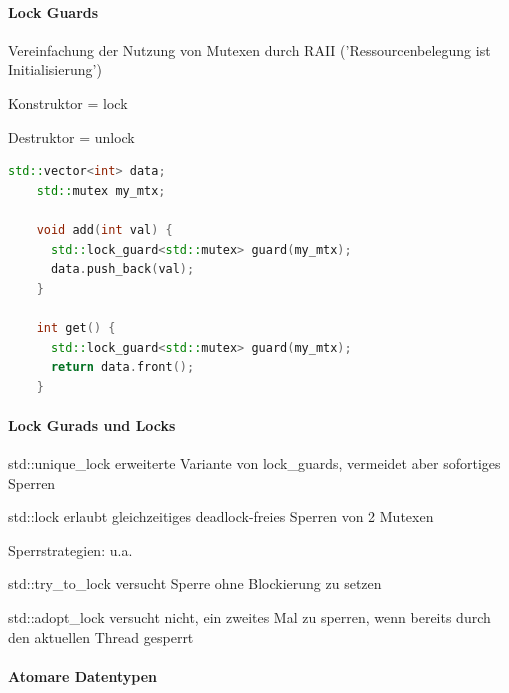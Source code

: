 \documentclass[10pt]{article}
\begin{document}
  \paragraph{Lock Guards}
  
  \begin{itemize*}
    \item Vereinfachung der Nutzung von Mutexen durch RAII ('Ressourcenbelegung ist Initialisierung')
    \item Konstruktor = lock
    \item Destruktor = unlock
  \end{itemize*}
  
  \begin{lstlisting}[language=C++]
    std::vector<int> data;
    std::mutex my_mtx;
  
    void add(int val) {
      std::lock_guard<std::mutex> guard(my_mtx);
      data.push_back(val);
    }
  
    int get() {
      std::lock_guard<std::mutex> guard(my_mtx);
      return data.front();
    }
    \end{lstlisting}
  
  \paragraph{Lock Gurads und Locks}
  
  \begin{itemize*}
    \item std::unique\_lock erweiterte Variante von lock\_guards, vermeidet aber sofortiges Sperren
    \item std::lock erlaubt gleichzeitiges deadlock-freies Sperren von 2 Mutexen
    \item Sperrstrategien: u.a.
    \begin{itemize*}
      \item std::try\_to\_lock versucht Sperre ohne Blockierung zu setzen
      \item std::adopt\_lock versucht nicht, ein zweites Mal zu sperren, wenn bereits durch den aktuellen Thread gesperrt
    \end{itemize*}
  \end{itemize*}
  
  \paragraph{Atomare Datentypen}
  
\end{document}
